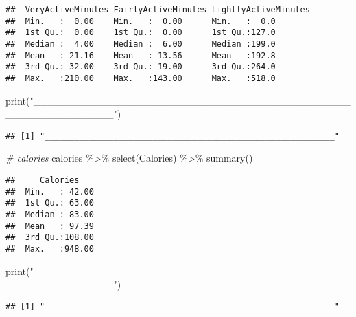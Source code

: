 \documentclass[
]{article}
\newenvironment{Shaded}{\begin{snugshade}}{\end{snugshade}}
\newcommand{\CommentTok}[1]{\textcolor[rgb]{0.56,0.35,0.01}{\textit{#1}}}
\newcommand{\FunctionTok}[1]{\textcolor[rgb]{0.00,0.00,0.00}{#1}}
\newcommand{\NormalTok}[1]{#1}
\newcommand{\SpecialCharTok}[1]{\textcolor[rgb]{0.00,0.00,0.00}{#1}}
\newcommand{\StringTok}[1]{\textcolor[rgb]{0.31,0.60,0.02}{#1}}
\begin{document}
\begin{verbatim}
##  VeryActiveMinutes FairlyActiveMinutes LightlyActiveMinutes
##  Min.   :  0.00    Min.   :  0.00      Min.   :  0.0       
##  1st Qu.:  0.00    1st Qu.:  0.00      1st Qu.:127.0       
##  Median :  4.00    Median :  6.00      Median :199.0       
##  Mean   : 21.16    Mean   : 13.56      Mean   :192.8       
##  3rd Qu.: 32.00    3rd Qu.: 19.00      3rd Qu.:264.0       
##  Max.   :210.00    Max.   :143.00      Max.   :518.0
\end{verbatim}

\begin{Shaded}
\begin{Highlighting}[]
\FunctionTok{print}\NormalTok{(}\StringTok{"\_\_\_\_\_\_\_\_\_\_\_\_\_\_\_\_\_\_\_\_\_\_\_\_\_\_\_\_\_\_\_\_\_\_\_\_\_\_\_\_\_\_\_\_\_\_\_\_\_\_\_\_\_\_\_\_\_\_\_"}\NormalTok{)}
\end{Highlighting}
\end{Shaded}

\begin{verbatim}
## [1] "___________________________________________________________"
\end{verbatim}

\begin{Shaded}
\begin{Highlighting}[]
\CommentTok{\# calories}
\NormalTok{calories }\SpecialCharTok{\%\textgreater{}\%}
  \FunctionTok{select}\NormalTok{(Calories) }\SpecialCharTok{\%\textgreater{}\%}
  \FunctionTok{summary}\NormalTok{()}
\end{Highlighting}
\end{Shaded}

\begin{verbatim}
##     Calories     
##  Min.   : 42.00  
##  1st Qu.: 63.00  
##  Median : 83.00  
##  Mean   : 97.39  
##  3rd Qu.:108.00  
##  Max.   :948.00
\end{verbatim}

\begin{Shaded}
\begin{Highlighting}[]
\FunctionTok{print}\NormalTok{(}\StringTok{"\_\_\_\_\_\_\_\_\_\_\_\_\_\_\_\_\_\_\_\_\_\_\_\_\_\_\_\_\_\_\_\_\_\_\_\_\_\_\_\_\_\_\_\_\_\_\_\_\_\_\_\_\_\_\_\_\_\_\_"}\NormalTok{)}
\end{Highlighting}
\end{Shaded}

\begin{verbatim}
## [1] "___________________________________________________________"
\end{verbatim}
\end{document}

